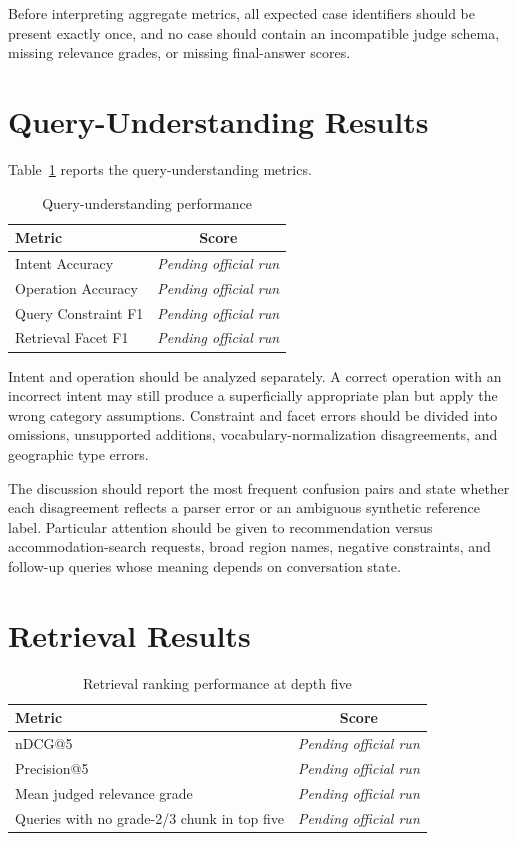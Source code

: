 Before interpreting aggregate metrics, all expected case identifiers should be
present exactly once, and no case should contain an incompatible judge schema,
missing relevance grades, or missing final-answer scores.

\section{Query-Understanding Results}

Table~\ref{tab:understanding-results} reports the query-understanding metrics.

\begin{table}[H]
\centering
\caption{Query-understanding performance}
\label{tab:understanding-results}
\begin{tabular}{lc}
\hline
\textbf{Metric} & \textbf{Score} \\
\hline
Intent Accuracy & \textit{Pending official run} \\
Operation Accuracy & \textit{Pending official run} \\
Query Constraint F1 & \textit{Pending official run} \\
Retrieval Facet F1 & \textit{Pending official run} \\
\hline
\end{tabular}
\end{table}

Intent and operation should be analyzed separately. A correct operation with an
incorrect intent may still produce a superficially appropriate plan but apply
the wrong category assumptions. Constraint and facet errors should be divided
into omissions, unsupported additions, vocabulary-normalization disagreements,
and geographic type errors.

The discussion should report the most frequent confusion pairs and state
whether each disagreement reflects a parser error or an ambiguous synthetic
reference label. Particular attention should be given to recommendation versus
accommodation-search requests, broad region names, negative constraints, and
follow-up queries whose meaning depends on conversation state.

\section{Retrieval Results}

\begin{table}[H]
\centering
\caption{Retrieval ranking performance at depth five}
\label{tab:retrieval-results}
\begin{tabular}{lc}
\hline
\textbf{Metric} & \textbf{Score} \\
\hline
nDCG@5 & \textit{Pending official run} \\
Precision@5 & \textit{Pending official run} \\
Mean judged relevance grade & \textit{Pending official run} \\
Queries with no grade-2/3 chunk in top five & \textit{Pending official run} \\
\hline
\end{tabular}
\end{table}

